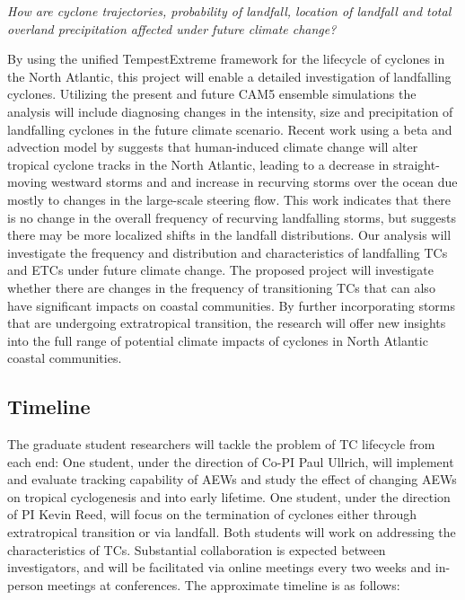 \documentclass[11pt]{article}
\begin{document}
\emph{How are cyclone trajectories, probability of landfall, location of landfall and total overland precipitation affected under future climate change?}

By using the unified TempestExtreme framework for the lifecycle of cyclones in the North Atlantic, this project will enable a detailed investigation of landfalling cyclones.  Utilizing the present and future CAM5 ensemble simulations the analysis will include diagnosing changes in the intensity, size and precipitation of landfalling cyclones in the future climate scenario. Recent work using a beta and advection model by \citet{Colbert2013} suggests that human-induced climate change will alter tropical cyclone tracks in the North Atlantic, leading to a decrease in straight-moving westward storms and and increase in recurving storms over the ocean due mostly to changes in the large-scale steering flow.  This work indicates that there is no change in the overall frequency of recurving landfalling storms, but suggests there may be more localized shifts in the landfall distributions. Our analysis will investigate the frequency and distribution and characteristics of landfalling TCs and ETCs under future climate change. The proposed project will investigate whether there are changes in the frequency of transitioning TCs that can also have significant impacts on coastal communities.  By further incorporating storms that are undergoing extratropical transition, the research will offer new insights into the full range of potential climate impacts of cyclones in North Atlantic coastal communities.

\subsection{Timeline} \label{sec:Timeline}

The graduate student researchers will tackle the problem of TC lifecycle from each end:  One student, under the direction of Co-PI Paul Ullrich, will implement and evaluate tracking capability of AEWs and study the effect of changing AEWs on tropical cyclogenesis and into early lifetime.  One student, under the direction of PI Kevin Reed, will focus on the termination of cyclones either through extratropical transition or via landfall.  Both students will work on addressing the characteristics of TCs.  Substantial collaboration is expected between investigators, and will be facilitated via online meetings every two weeks and in-person meetings at conferences.  The approximate timeline is as follows:
\end{document}

